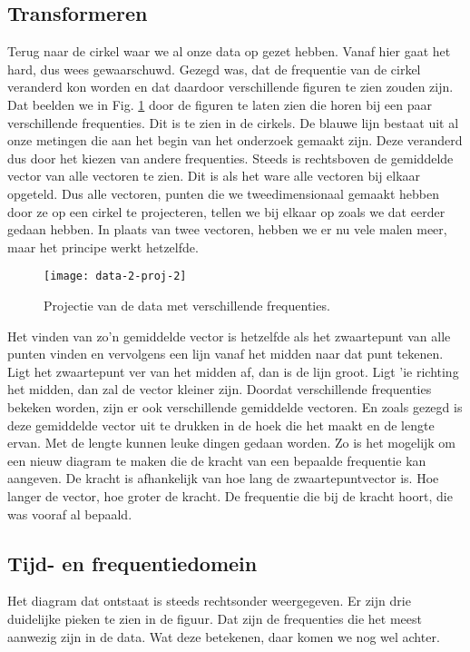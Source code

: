 \documentclass[11pt,fleqn]{book} %
\begin{document}
\subsection{Transformeren}
Terug naar de cirkel waar we al onze data op gezet hebben. Vanaf hier gaat het hard, dus wees gewaarschuwd. Gezegd was, dat de frequentie van de cirkel veranderd kon worden en dat daardoor verschillende figuren te zien zouden zijn. Dat beelden we in Fig. \ref{fig:data-2-proj-2} door de figuren te laten zien die horen bij een paar verschillende frequenties. Dit is te zien in de cirkels. De blauwe lijn bestaat uit al onze metingen die aan het begin van het onderzoek gemaakt zijn. Deze veranderd dus door het kiezen van andere frequenties. Steeds is rechtsboven de gemiddelde vector van alle vectoren te zien. Dit is als het ware alle vectoren bij elkaar opgeteld. Dus alle vectoren, punten die we tweedimensionaal gemaakt hebben door ze op een cirkel te projecteren, tellen we bij elkaar op zoals we dat eerder gedaan hebben. In plaats van twee vectoren, hebben we er nu vele malen meer, maar het principe werkt hetzelfde.

\begin{figure}[h]
	\centering\texttt{[image: data-2-proj-2]}
	\caption{Projectie van de data met verschillende frequenties.}
	\label{fig:data-2-proj-2}
\end{figure}

Het vinden van zo’n gemiddelde vector is hetzelfde als het zwaartepunt van alle punten vinden en vervolgens een lijn vanaf het midden naar dat punt tekenen. Ligt het zwaartepunt ver van het midden af, dan is de lijn groot. Ligt 'ie richting het midden, dan zal de vector kleiner zijn. Doordat verschillende frequenties bekeken worden, zijn er ook verschillende gemiddelde vectoren. En zoals gezegd is deze gemiddelde vector uit te drukken in de hoek die het maakt en de lengte ervan. Met de lengte kunnen leuke dingen gedaan worden. Zo is het mogelijk om een nieuw diagram te maken die de kracht van een bepaalde frequentie kan aangeven. De kracht is afhankelijk van hoe lang de zwaartepuntvector is. Hoe langer de vector, hoe groter de kracht. De frequentie die bij de kracht hoort, die was vooraf al bepaald.

\subsection{Tijd- en frequentiedomein}
Het diagram dat ontstaat is steeds rechtsonder weergegeven. Er zijn drie duidelijke pieken te zien in de figuur. Dat zijn de frequenties die het meest aanwezig zijn in de data. Wat deze betekenen, daar komen we nog wel achter.
\end{document}
